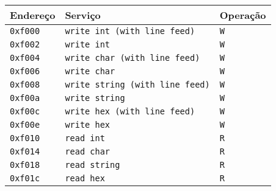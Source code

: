 \documentclass[11pt,a4paper]{report}
\begin{document}
\begin{table}[htb!]
\centering
\begin{tabular}{|p{2.0cm}|p{9.0cm}|p{2.0cm}|}
\hline
\bf{Endereço} & \bf{Serviço} & \bf{Operação} \\ \hline \hline
\texttt{0xf000} & \texttt{write int (with line feed)} & \texttt{W} \\ \hline
\texttt{0xf002} & \texttt{write int} & \texttt{W} \\ \hline
\texttt{0xf004} & \texttt{write char (with line feed)} & \texttt{W} \\ \hline
\texttt{0xf006} & \texttt{write char} & \texttt{W} \\ \hline
\texttt{0xf008} & \texttt{write string (with line feed)} & \texttt{W} \\ \hline
\texttt{0xf00a} & \texttt{write string} & \texttt{W} \\ \hline
\texttt{0xf00c} & \texttt{write hex (with line feed)} & \texttt{W} \\ \hline
\texttt{0xf00e} & \texttt{write hex} & \texttt{W} \\ \hline
\texttt{0xf010} & \texttt{read int} & \texttt{R} \\ \hline
\texttt{0xf014} & \texttt{read char} & \texttt{R} \\ \hline
\texttt{0xf018} & \texttt{read string} & \texttt{R} \\ \hline
\texttt{0xf01c} & \texttt{read hex} & \texttt{R} \\ \hline
\end{tabular}
\end{table}
\end{document}
